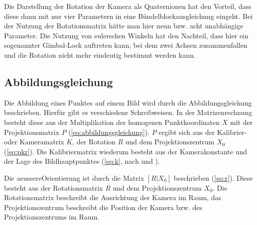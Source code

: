 \documentclass[./00PhotoBox.tex]{subfiles}
\begin{document}
Die Darstellung der Rotation der Kamera als Quaternionen hat den Vorteil, dass diese dann mit nur vier Parametern in eine Bündelblockausgleichung eingeht. Bei der Nutzung der Rotationsmatrix hätte man hier neun bzw. acht unabhängige Parameter. Die Nutzung von eulerschen Winkeln hat den Nachteil, dass hier ein sogenannter Gimbal-Lock auftreten kann, bei dem zwei Achsen zusammenfallen und die Rotation nicht mehr eindeutig bestimmt werden kann. \citep[S. 63]{luhmann}

\subsection{Abbildungsgleichung}
\label{ss:abbildungsgleichung}
Die Abbildung eines Punktes auf einem Bild wird durch die Abbildungsgleichung beschrieben. Hierfür gibt es verschiedene Schreibweisen. In der Matrizenrechnung besteht diese aus der Multiplikation der homogenen Punktkoordinaten $X$ mit der Projektionsmatrix $P$ (\autoref{eq:abbildungsgleichung}). $P$ ergibt sich aus der Kalibrier- oder Kameramatrix $K$, der Rotation $R$ und dem Projektionszentrum $X_0$ (\autoref{eq:pkr}). Die Kalibriermatrix wiederum besteht aus der \Gls{Kamerakonstante} und der Lage des \Gls{Bildhauptpunkt}es (\autoref{eq:k}, nach \citealp[S. 244]{hartley} und \citealp[S. 290]{luhmann}).

Die \gls{aeussereOrientierung} ist durch die Matrix $[R|X_0]$ beschrieben (\autoref{eq:r}). Diese besteht aus der Rotationsmatrix $R$ und dem Projektionszentrum $X_0$. Die Rotationsmatrix beschreibt die Ausrichtung der Kamera im Raum, das Projektionszentrum beschreibt die Position der Kamera bzw. des Projektionszentrums im Raum.
\end{document}
